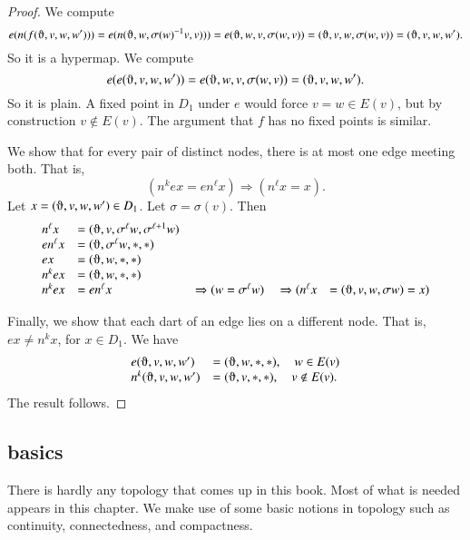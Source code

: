 \begin{proof}  We compute
    $$e(n(f(\orgn,v,w,w'))) = e(n(\orgn,w,\sigma(w)^{-1} v,v))) =
        e(\orgn,w,v,\sigma(w, v)) = (\orgn,v,w,\sigma(w, v)) = (\orgn,v,w,w').$$
So it is a hypermap. We compute
    $$e(e(\orgn,v,w,w')) = e(\orgn,w,v,\sigma(w,v)) = (\orgn,v,w,w').$$
So it is plain. A fixed point in $D_1$ under $e$ would force $v = w\in E(v)$,
but by construction $v\not\in E(v)$.  The argument that $f$ has no
fixed points is similar.

   We show that for every pair of distinct nodes, there is at most one edge
meeting both.
That is,
        $$(n^k e x = e n^\ell x)\Rightarrow (n^\ell x = x).$$
Let $x = (\orgn,v,w,w')\in D_1$.  Let $\sigma=\sigma(v)$. Then
    $$
    \begin{array}{lllllll}
    n^\ell x &= (\orgn,v,\sigma^\ell w,\sigma^{\ell+1}w)\\
    e n^\ell x &= (\orgn,\sigma^\ell w,*,*)\\
    e x &= (\orgn,w,*,*)\\
    n^k e x &= (\orgn,w,*,*)\\
    n^k e x &= e n^\ell x &\ \Rightarrow (w = \sigma^\ell w) &\ \Rightarrow
    (n^\ell x &= (\orgn,v,w,\sigma w) = x)
    \end{array}
    $$

Finally, we show that each dart of an edge lies on a different node.
That is, $e x \ne n^k x$, for $x\in D_1$.  We have
    $$
    \begin{array}{lll}
        e(\orgn,v,w,w') &= (\orgn,w,*,*),\quad w\in E(v)\\
        n^k(\orgn,v,w,w') &= (\orgn,v,*,*),\quad v\not\in E(v).
    \end{array}
    $$
The result follows.
\end{proof}

\subsection{basics}

There is hardly any topology that comes up in this book.  Most of
what is needed appears in this chapter.  We make use of some basic
notions in topology such as continuity, connectedness, and compactness.






